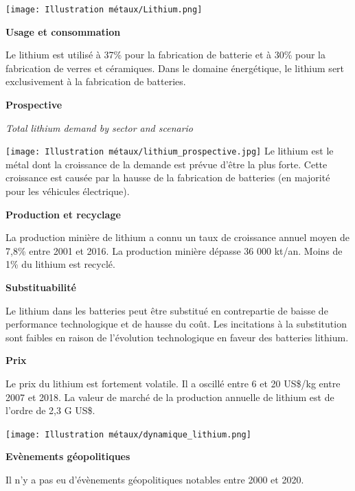 \texttt{[image: Illustration métaux/Lithium.png]}

\begin{center}
    \textbf{Usage et consommation}
\end{center}
Le lithium est utilisé à 37\% pour la fabrication de batterie et à 30\%
pour la fabrication de verres et céramiques. Dans le domaine énergétique,
le lithium sert exclusivement à la fabrication de batteries.
\begin{center}
    \textbf{Prospective}
\end{center}
\begin{multicols}{2}
    \begin{center}
        \textit{Total lithium demand by sector and scenario}
    \end{center}
    \texttt{[image: Illustration métaux/lithium\_prospective.jpg]}
    \vfill\null
    \columnbreak
    Le lithium est le métal dont la croissance de la demande est prévue
    d'être la plus forte. Cette croissance est causée par la hausse de la
    fabrication de batteries (en majorité pour les véhicules électrique).

    \end{multicols}
\begin{center}
    \textbf{Production et recyclage}
\end{center}
La production minière de lithium a connu un taux de croissance annuel moyen
de 7,8\% entre 2001 et 2016. La production minière dépasse 36 000 kt/an. Moins de 1\% du lithium est recyclé. 
\begin{center}
    \textbf{Substituabilité}
\end{center}
Le lithium dans les batteries peut être substitué en contrepartie de baisse
de performance technologique et de hausse du coût. Les incitations à la substitution
sont faibles en raison de l'évolution technologique en faveur des batteries lithium.
\begin{center}
    \textbf{Prix}
\end{center}
Le prix du lithium est fortement volatile. Il a oscillé entre 6 et 20 US\$/kg entre
2007 et 2018. La valeur de marché de la production annuelle de lithium est de
l'ordre de 2,3 G US\$.
\clearpage
\begin{center}
    \texttt{[image: Illustration métaux/dynamique\_lithium.png]}
\end{center}
\begin{center}
    \textbf{Evènements géopolitiques}
\end{center}
Il n'y a pas eu d'évènements géopolitiques notables entre 2000 et 2020.
